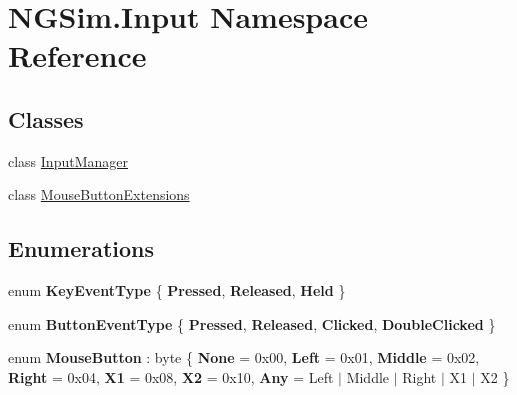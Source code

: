 \hypertarget{namespace_n_g_sim_1_1_input}{}\section{N\+G\+Sim.\+Input Namespace Reference}
\label{namespace_n_g_sim_1_1_input}
\subsection*{Classes}
\begin{DoxyCompactItemize}
\item 
class \hyperlink{class_n_g_sim_1_1_input_1_1_input_manager}{Input\+Manager}
\item 
class \hyperlink{class_n_g_sim_1_1_input_1_1_mouse_button_extensions}{Mouse\+Button\+Extensions}
\end{DoxyCompactItemize}
\subsection*{Enumerations}
\begin{DoxyCompactItemize}
\item 
\mbox{\label{namespace_n_g_sim_1_1_input_a7185cd91c8d23828323191385a751424}} 
enum {\bfseries Key\+Event\+Type} \{ {\bfseries Pressed}, 
{\bfseries Released}, 
{\bfseries Held}
 \}
\item 
\mbox{\label{namespace_n_g_sim_1_1_input_aea1f823027064a2c13132c35751c3ca2}} 
enum {\bfseries Button\+Event\+Type} \{ {\bfseries Pressed}, 
{\bfseries Released}, 
{\bfseries Clicked}, 
{\bfseries Double\+Clicked}
 \}
\item 
\mbox{\label{namespace_n_g_sim_1_1_input_abeaa43cde50a661a8f7eeb5d336bc7fc}} 
enum {\bfseries Mouse\+Button} \+: byte \{ \newline
{\bfseries None} = 0x00, 
{\bfseries Left} = 0x01, 
{\bfseries Middle} = 0x02, 
{\bfseries Right} = 0x04, 
\newline
{\bfseries X1} = 0x08, 
{\bfseries X2} = 0x10, 
{\bfseries Any} = Left $\vert$ Middle $\vert$ Right $\vert$ X1 $\vert$ X2
 \}
\end{DoxyCompactItemize}
